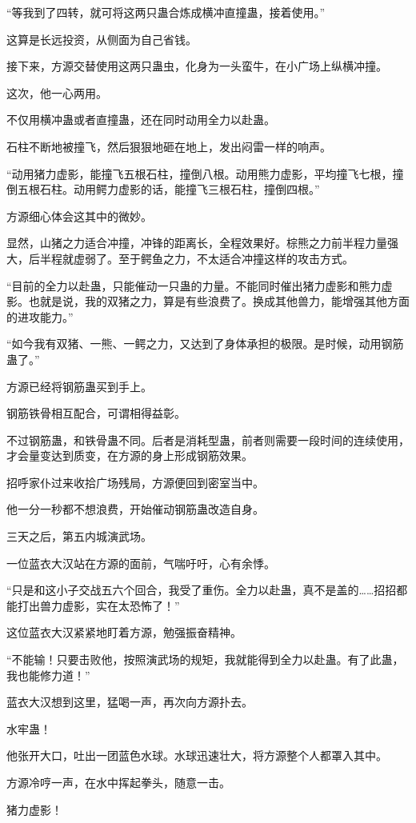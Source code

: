 \begin{this_body}
“等我到了四转，就可将这两只蛊合炼成横冲直撞蛊，接着使用。”

这算是长远投资，从侧面为自己省钱。

接下来，方源交替使用这两只蛊虫，化身为一头蛮牛，在小广场上纵横冲撞。

这次，他一心两用。

不仅用横冲蛊或者直撞蛊，还在同时动用全力以赴蛊。

石柱不断地被撞飞，然后狠狠地砸在地上，发出闷雷一样的响声。

“动用猪力虚影，能撞飞五根石柱，撞倒八根。动用熊力虚影，平均撞飞七根，撞倒五根石柱。动用鳄力虚影的话，能撞飞三根石柱，撞倒四根。”

方源细心体会这其中的微妙。

显然，山猪之力适合冲撞，冲锋的距离长，全程效果好。棕熊之力前半程力量强大，后半程就虚弱了。至于鳄鱼之力，不太适合冲撞这样的攻击方式。

“目前的全力以赴蛊，只能催动一只蛊的力量。不能同时催出猪力虚影和熊力虚影。也就是说，我的双猪之力，算是有些浪费了。换成其他兽力，能增强其他方面的进攻能力。”

“如今我有双猪、一熊、一鳄之力，又达到了身体承担的极限。是时候，动用钢筋蛊了。”

方源已经将钢筋蛊买到手上。

钢筋铁骨相互配合，可谓相得益彰。

不过钢筋蛊，和铁骨蛊不同。后者是消耗型蛊，前者则需要一段时间的连续使用，才会量变达到质变，在方源的身上形成钢筋效果。

招呼家仆过来收拾广场残局，方源便回到密室当中。

他一分一秒都不想浪费，开始催动钢筋蛊改造自身。

三天之后，第五内城演武场。

一位蓝衣大汉站在方源的面前，气喘吁吁，心有余悸。

“只是和这小子交战五六个回合，我受了重伤。全力以赴蛊，真不是盖的……招招都能打出兽力虚影，实在太恐怖了！”

这位蓝衣大汉紧紧地盯着方源，勉强振奋精神。

“不能输！只要击败他，按照演武场的规矩，我就能得到全力以赴蛊。有了此蛊，我也能修力道！”

蓝衣大汉想到这里，猛喝一声，再次向方源扑去。

水牢蛊！

他张开大口，吐出一团蓝色水球。水球迅速壮大，将方源整个人都罩入其中。

方源冷哼一声，在水中挥起拳头，随意一击。

猪力虚影！


\end{this_body}
